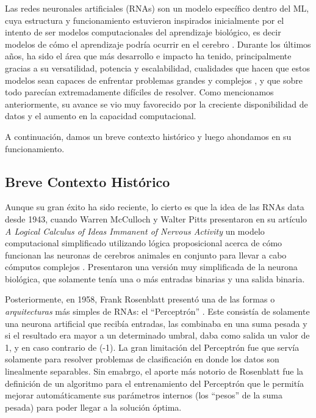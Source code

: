 \documentclass[../../main.tex]{subfiles}
\begin{document}
Las redes neuronales artificiales (RNAs) son un modelo específico dentro del ML, cuya
estructura y funcionamiento estuvieron inspirados inicialmente por el intento de ser
modelos computacionales del aprendizaje biológico, es decir modelos de cómo el aprendizaje
podría ocurrir en el cerebro \cite{deep-learning}. Durante los últimos años, ha sido el
área que más desarrollo e impacto ha tenido, principalmente gracias a su versatilidad,
potencia y escalabilidad, cualidades que hacen que estos modelos sean capaces de enfrentar
problemas grandes y complejos \cite{hands-on-ML-sklearn-tf}, y que sobre todo parecían
extremadamente difíciles de resolver. Como mencionamos anteriormente, su avance se vio muy
favorecido por la creciente disponibilidad de datos y el aumento en la capacidad
computacional.

A continuación, damos un breve contexto histórico y luego ahondamos en su funcionamiento.

\subsection{Breve Contexto Histórico}
Aunque su gran éxito ha sido reciente, lo cierto es que la idea de las RNAs data desde
1943, cuando Warren McCulloch y Walter Pitts presentaron en su artículo \textit{A Logical
Calculus of Ideas Immanent of Nervous Activity} \cite{mculloch-pitts-1943} un modelo
computacional simplificado utilizando lógica proposicional acerca de cómo funcionan las
neuronas de cerebros animales en conjunto para llevar a cabo cómputos complejos
\cite{hands-on-ML-sklearn-tf}. Presentaron una versión muy simplificada de la neurona
biológica, que solamente tenía una o más entradas binarias y una salida binaria.

Posteriormente, en 1958, Frank Rosenblatt presentó una de las formas o
\textit{arquitecturas} más simples de RNAs: el ``Perceptrón''
\cite{rosenblatt1958perceptron}. Este consistía de solamente una neurona artificial que
recibía entradas, las combinaba en una suma pesada y si el resultado era mayor a un
determinado umbral, daba como salida un valor de 1, y en caso contrario de (-1). La gran
limitación del Perceptrón fue que servía solamente para resolver problemas de
clasificación en donde los datos son linealmente separables. Sin emabrgo, el aporte más
notorio de Rosenblatt fue la definición de un algoritmo para el entrenamiento del
Perceptrón que le permitía mejorar automáticamente sus parámetros internos (los ``pesos''
de la suma pesada) para poder llegar a la solución óptima.
\end{document}
